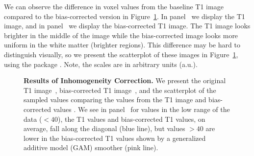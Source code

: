 We can observe the difference in voxel values from the baseline T1 image compared to the bias-corrected version in Figure~\ref{fig:bias_correct}.  In panel~\protect{} we display the T1 image, and in panel~\protect{} we display the bias-corrected T1 image.  The T1 image looks brighter in the middle of the image while the bias-corrected image looks more uniform in the white matter (brighter regions).  This difference may be hard to distinguish visually, so we present the scatterplot of these images in Figure~\ref{fig:bias_correct}\protect{}, using the  package \citep{wickham_ggplot2:_2009}.  Note, the scales are in arbitrary units (a.u.).


\begin{figure}
\hfill
\hfill
\caption{{\bf Results of Inhomogeneity Correction.}  We present the original T1 image~\protect{}, bias-corrected T1 image~\protect{}, and the scatterplot of the sampled values comparing the values from the T1 image and bias-corrected values \protect{}.  We see in panel~\protect{} for values in the low range of the data ($< 40$), the T1 values and bias-corrected T1 values, on average, fall along the diagonal (blue line), but values $> 40$ are lower in the bias-corrected T1 values shown by a generalized additive model (GAM) smoother (pink line).  }
\label{fig:bias_correct}
\end{figure}


